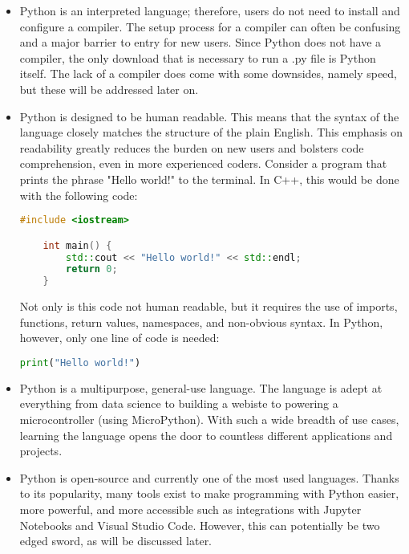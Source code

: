 \begin{itemize}
    \item Python is an interpreted language; therefore, users do not need to install and configure
    a compiler. The setup process for a compiler can often be confusing and a major barrier to entry
    for new users. Since Python does not have a compiler, the only download that is necessary to run 
    a .py file is Python itself. The lack of a compiler does come with some downsides, namely speed,
    but these will be addressed later on.
    \item Python is designed to be human readable. This means that the syntax of the language closely
    matches the structure of the plain English. This emphasis on readability greatly reduces the
    burden on new users and bolsters code comprehension, even in more experienced coders. Consider 
    a program that prints the phrase "Hello world!"  to the terminal. In C++, this would be done with 
    the following code:

    \begin{lstlisting}[language=C++]
    #include <iostream>

    int main() {
        std::cout << "Hello world!" << std::endl;
        return 0;
    }
    \end{lstlisting}

    Not only is this code not human readable, but it requires the use of imports, functions, return
    values, namespaces, and non-obvious syntax. In Python, however, only one line of code is needed:

    \begin{lstlisting}[language=Python]
    print("Hello world!")
    \end{lstlisting}
    \item Python is a multipurpose, general-use language. The language is adept at everything from
    data science to building a webiste to powering a microcontroller (using MicroPython). With such 
    a wide breadth of use cases, learning the language opens the door to countless different applications 
    and projects.
    \item Python is open-source and currently one of the most used languages. Thanks to its popularity,
    many tools exist to make programming with Python easier, more powerful, and more accessible such
    as integrations with Jupyter Notebooks and Visual Studio Code. However, this can potentially be 
    two edged sword, as will be discussed later.
\end{itemize}

